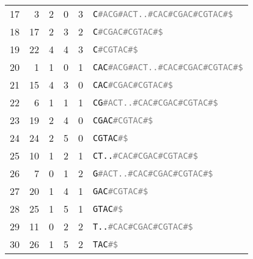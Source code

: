 \begin{table*}
\begin{tabular}{rrrrrl}
        17  &  3 &  2 & 0 & 3 & \texttt{C\textcolor{gray}{\#ACG\#ACT..\#CAC\#CGAC\#CGTAC\#\$}}    \\
        18  & 17 &  2 & 3 & 2 & \texttt{C\textcolor{gray}{\#CGAC\#CGTAC\#\$}}                     \\
        19  & 22 &  4 & 4 & 3 & \texttt{C\textcolor{gray}{\#CGTAC\#\$}}                           \\
        20  &  1 &  1 & 0 & 1 & \texttt{CAC\textcolor{gray}{\#ACG\#ACT..\#CAC\#CGAC\#CGTAC\#\$}}  \\
        21  & 15 &  4 & 3 & 0 & \texttt{CAC\textcolor{gray}{\#CGAC\#CGTAC\#\$}}                   \\
        22  &  6 &  1 & 1 & 1 & \texttt{CG\textcolor{gray}{\#ACT..\#CAC\#CGAC\#CGTAC\#\$}}        \\
        23  & 19 &  2 & 4 & 0 & \texttt{CGAC\textcolor{gray}{\#CGTAC\#\$}}                        \\
        24  & 24 &  2 & 5 & 0 & \texttt{CGTAC\textcolor{gray}{\#\$}}                              \\
        25  & 10 &  1 & 2 & 1 & \texttt{CT..\textcolor{gray}{\#CAC\#CGAC\#CGTAC\#\$}}             \\
        26  &  7 &  0 & 1 & 2 & \texttt{G\textcolor{gray}{\#ACT..\#CAC\#CGAC\#CGTAC\#\$}}         \\
        27  & 20 &  1 & 4 & 1 & \texttt{GAC\textcolor{gray}{\#CGTAC\#\$}}                         \\
        28  & 25 &  1 & 5 & 1 & \texttt{GTAC\textcolor{gray}{\#\$}}                               \\
        29  & 11 &  0 & 2 & 2 & \texttt{T..\textcolor{gray}{\#CAC\#CGAC\#CGTAC\#\$}}              \\
        30  & 26 &  1 & 5 & 2 & \texttt{TAC\textcolor{gray}{\#\$}}                                \\
        \bottomrule
    \end{tabular}
\end{table*}


